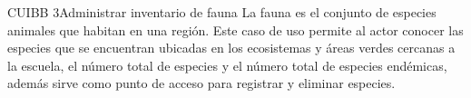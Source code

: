 
\begin{UseCase}{CUIBB 3}{Administrar inventario de fauna}
    {
	La fauna es el conjunto de especies animales que habitan en una región. Este caso de uso permite al actor conocer las especies que se encuentran ubicadas en los ecosistemas y áreas verdes cercanas a la escuela, el número total de especies y el número total de especies endémicas, además sirve como punto de acceso para registrar y eliminar especies. 
    }
    
    


\end{UseCase}

